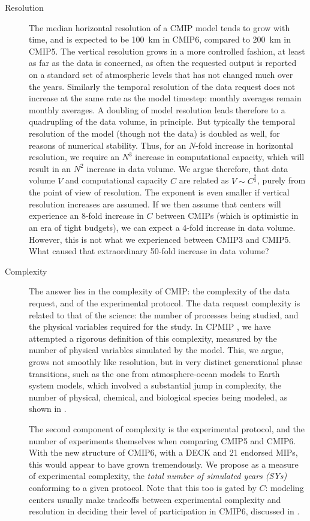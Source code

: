 \documentclass[gmd,manuscript]{copernicus}
\newcommand{\bibref}[1] { \cite{ref:#1}}
\newcommand{\pipref}[1] {\citep{ref:#1}}
\begin{document}
\begin{description}
\item[Resolution] The median horizontal resolution of a CMIP model
  tends to grow with time, and is expected to be 100~km in CMIP6,
  compared to 200~km in CMIP5. The vertical resolution grows in a more
  controlled fashion, at least as far as the data is concerned, as
  often the requested output is reported on a standard set of
  atmospheric levels that has not changed much over the years.
  Similarly the temporal resolution of the data request does not
  increase at the same rate as the model timestep: monthly averages
  remain monthly averages. A doubling of model resolution leads
  therefore to a quadrupling of the data volume, in principle. But
  typically the temporal resolution of the model (though not the data)
  is doubled as well, for reasons of numerical stability. Thus, for an
  $N$-fold increase in horizontal resolution, we require an $N^3$
  increase in computational capacity, which will result in an $N^2$
  increase in data volume. We argue therefore, that data volume $V$
  and computational capacity $C$ are related as $V \sim C^\frac23$,
  purely from the point of view of resolution. The exponent is even
  smaller if vertical resolution increases are assumed. If we then
  assume that centers will experience an 8-fold increase in $C$
  between CMIPs (which is optimistic in an era of tight budgets), we
  can expect a 4-fold increase in data volume. However, this is not
  what we experienced between CMIP3 and CMIP5. What caused that
  extraordinary 50-fold increase in data volume?
\item[Complexity] The answer lies in the complexity of CMIP: the
  complexity of the data request, and of the experimental protocol.
  The data request complexity is related to that of the science: the
  number of processes being studied, and the physical variables
  required for the study. In CPMIP \pipref{balajietal2017}, we have
  attempted a rigorous definition of this complexity, measured
  by the number of physical variables simulated by the model. This, we
  argue, grows not smoothly like resolution, but in very distinct
  generational phase transitions, such as the one from
  atmosphere-ocean models to Earth system models, which involved a
  substantial jump in complexity, the number of physical, chemical,
  and biological species being modeled, as shown in
  \bibref{balajietal2017}.

  The second component of complexity is the experimental protocol, and 
  the number of experiments themselves when comparing CMIP5 and CMIP6.
  With the new structure of CMIP6, with a DECK and 21 endorsed MIPs,
  this would appear to have grown tremendously. We propose as a
  measure of experimental complexity, the \emph{total number of 
  simulated years (SYs)} conforming to a given protocol. Note that
  this too is gated by $C$: modeling centers usually make tradeoffs
  between experimental complexity and resolution in deciding their
  level of participation in CMIP6, discussed in 
  \bibref{balajietal2017}.
\end{description}
\end{document}
